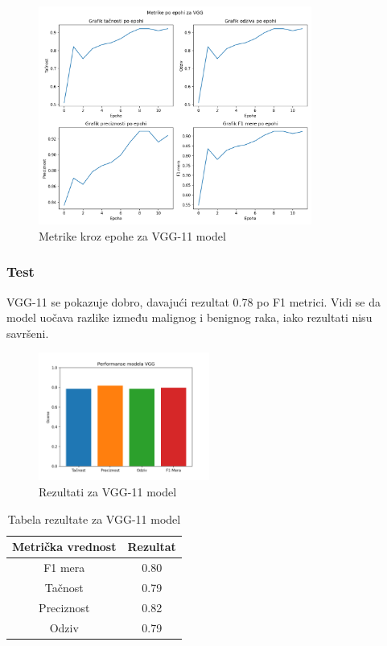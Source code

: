\documentclass{article}
\begin{document}
\begin{figure}[H]
    \centering
    \includegraphics[width=0.8\textwidth]{rezultati/VGG_metrike_po_epohi.png} 
    \caption{Metrike kroz epohe za VGG-11 model} 
    \label{VGG metrike po epohi}
\end{figure}

\subsubsection{Test}

VGG-11 se pokazuje dobro, davajući rezultat 0.78 po F1 metrici. Vidi se da model uočava razlike između malignog i benignog raka, iako rezultati nisu savršeni.

\begin{figure}[H]
    \centering
    \includegraphics[width=0.5\textwidth]{rezultati/VGG_rezultati.png} 
    \caption{Rezultati za VGG-11 model} 
    \label{VGG rezultati}
\end{figure}

\begin{table}[H]
    \centering
    \begin{tabular}{|c|c|}
        \hline
        \textbf{Metrička vrednost} & \textbf{Rezultat} \\ \hline
        F1 mera & 0.80 \\ \hline
        Tačnost & 0.79 \\ \hline
        Preciznost & 0.82 \\ \hline
        Odziv & 0.79 \\ \hline
    \end{tabular}
    \caption{Tabela rezultate za VGG-11 model}
    \label{tab:vgg11_performance}
\end{table}
\end{document}
